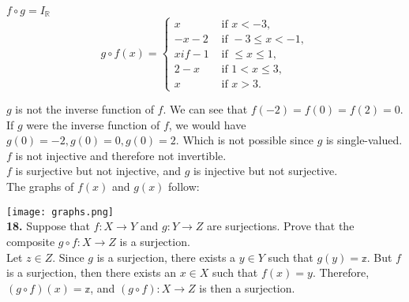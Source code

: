 \documentclass[paper=letter, fontsize=11pt]{scrartcl} %
\begin{document}
$f \circ g = I_\mathbb{R}$ \\
\[g \circ f(x) = \left\{
    \begin{array}{lr}
	x & \text{ if } x < -3, \\
	-x - 2 & \text{ if } -3 \le x < -1, \\
	x if -1 & \text{ if } \le x \le 1, \\
	2 - x & \text{ if } 1 < x \le 3, \\
	x & \text{ if } x > 3.
    \end{array}
\right.
\]

$g$ is not the inverse function of $f$. We can see that $f(-2) = f(0) = f(2) = 0$.
If $g$ were the inverse function of $f$, we would have $g(0) = -2, g(0) = 0, g(0) = 2.$
Which is not possible since $g$ is single-valued. $f$ is not injective and therefore
not invertible. \\
$f$ is surjective but not injective, and $g$ is injective but not surjective. \\

The graphs of $f(x)$ and $g(x)$ follow:

\texttt{[image: graphs.png]}
\\

\textbf{18.} Suppose that $f: X \rightarrow Y$ and $g: Y \rightarrow Z$ are surjections. Prove that the
composite $g \circ f: X \rightarrow Z$ is a surjection. \\

Let $z \in Z$. Since $g$ is a surjection, there exists a $y \in Y$ such that $g(y)=\mathbb{z}$.
But $f$ is a surjection, then there exists an $x \in X$ such that $f(x) = y$. Therefore, 
$(g \circ f)(x) = \mathbb{z}$, and $(g \circ f): X \rightarrow Z$ is then a surjection. \\
\end{document}
